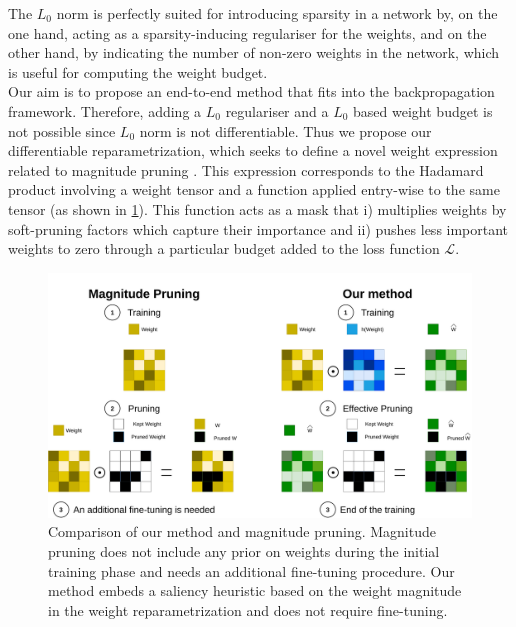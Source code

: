 The $L_0$ norm is perfectly suited for introducing sparsity in a network by, on
the one hand, acting as a sparsity-inducing regulariser for the weights, and on
the other hand, by indicating the number of non-zero weights in the network,
which is useful for computing the weight budget. \\

Our aim is to propose an end-to-end method that fits into the backpropagation
framework. Therefore, adding a $L_0$ regulariser and a $L_0$ based weight budget
is not possible since $L_0$ norm is not differentiable. Thus we propose our
differentiable reparametrization, which seeks to define a novel weight
expression related to magnitude pruning
\cite{DBLP:conf/nips/CunDS89,DBLP:conf/nips/HanPTD15}. This expression
corresponds to the Hadamard product involving a weight tensor and a function
applied entry-wise to the same tensor (as shown in
\cref{fig:chap1:comparison_reparam_vs_mag_pruning}). This function acts as a
mask that i) multiplies weights by soft-pruning factors which capture their
importance and ii) pushes less important weights to zero through a particular
budget added to the loss function $\mathcal{L}$. \\

\begin{figure}[h]
    \centerline{\includegraphics[width=12.5cm]{chapter_1/assets/comparison_reparam_vs_mag_pruning.pdf}}
  \caption{Comparison of our method and magnitude pruning. Magnitude pruning
  does not include any prior on weights during the initial training phase
  and needs an additional fine-tuning procedure. Our method embeds a saliency
  heuristic based on the weight magnitude in the weight reparametrization and
  does not require fine-tuning.}
  \label{fig:chap1:comparison_reparam_vs_mag_pruning}
\end{figure}


